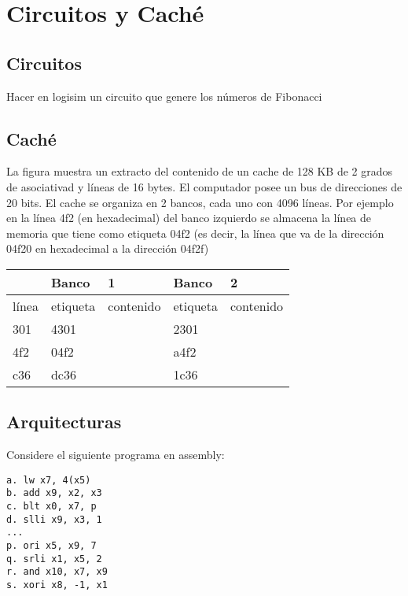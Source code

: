 \hypertarget{circuitos-y-cachuxe9}{%
\section{Circuitos y Caché}\label{circuitos-y-cachuxe9}}

\hypertarget{circuitos}{%
\subsection{Circuitos}\label{circuitos}}

Hacer en logisim un circuito que genere los números de Fibonacci

\hypertarget{cachuxe9}{%
\subsection{Caché}\label{cachuxe9}}

La figura muestra un extracto del contenido de un cache de 128 KB de 2
grados de asociativad y líneas de 16 bytes. El computador posee un bus
de direcciones de 20 bits. El cache se organiza en 2 bancos, cada uno
con 4096 líneas. Por ejemplo en la línea 4f2 (en hexadecimal) del banco
izquierdo se almacena la línea de memoria que tiene como etiqueta 04f2
(es decir, la línea que va de la dirección 04f20 en hexadecimal a la
dirección 04f2f)

\begin{longtable}[]{@{}lllll@{}}
\toprule()
& Banco & 1 & Banco & 2 \\
\midrule()
\endhead
línea & etiqueta & contenido & etiqueta & contenido \\
301 & 4301 & & 2301 & \\
4f2 & 04f2 & & a4f2 & \\
c36 & dc36 & & 1c36 & \\
\bottomrule()
\end{longtable}

\hypertarget{arquitecturas}{%
\subsection{Arquitecturas}\label{arquitecturas}}

Considere el siguiente programa en assembly:

\begin{verbatim}
a. lw x7, 4(x5)
b. add x9, x2, x3
c. blt x0, x7, p
d. slli x9, x3, 1
...
p. ori x5, x9, 7
q. srli x1, x5, 2
r. and x10, x7, x9
s. xori x8, -1, x1
\end{verbatim}
